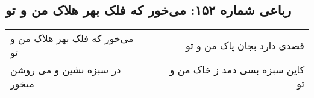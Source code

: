 \begin{center}
\section*{رباعی شماره ۱۵۲: می‌خور که فلک بهر هلاک من و تو}
\label{sec:sh152}
\begin{longtable}{l p{0.5cm} r}
می‌خور که فلک بهر هلاک من و تو
&&
قصدی دارد بجان پاک من و تو
\\
در سبزه نشین و می روشن میخور
&&
کاین سبزه بسی دمد ز خاک من و تو
\\
\end{longtable}
\end{center}
